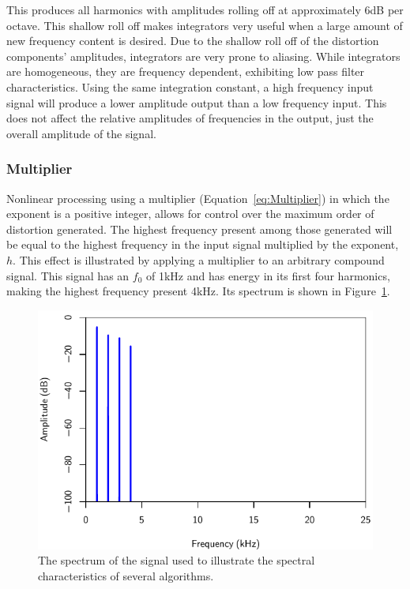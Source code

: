 			This produces all harmonics with amplitudes rolling off at approximately 6dB per octave. This
			shallow roll off makes integrators very useful when a large amount of new frequency content is
			desired. Due to the shallow roll off of the distortion components' amplitudes, integrators are very
			prone to aliasing. While integrators are homogeneous, they are frequency dependent, exhibiting low
			pass filter characteristics. Using the same integration constant, a high frequency input signal
			will produce a lower amplitude output than a low frequency input. This does not affect the
			relative amplitudes of frequencies in the output, just the overall amplitude of the signal.

		\subsubsection*{Multiplier}
			Nonlinear processing using a multiplier (Equation~\ref{eq:Multiplier}) in which the exponent is a
			positive integer, allows for control over the maximum order of distortion generated. The highest
			frequency present among those generated will be equal to the highest frequency in the input signal
			multiplied by the exponent, $h$. This effect is illustrated by applying a multiplier to an
			arbitrary compound signal. This signal has an $f_{0}$ of 1kHz and has energy in its first four
			harmonics, making the highest frequency present 4kHz. Its spectrum is shown in
			Figure~\ref{fig:FourHarmonics}.

			\begin{figure}[h!]
				\centering
				\includegraphics{chapter5/Images/FourHarmonics.pdf}
				\caption{The spectrum of the signal used to illustrate the spectral characteristics of
					several algorithms.}
				\label{fig:FourHarmonics}
			\end{figure}
			

